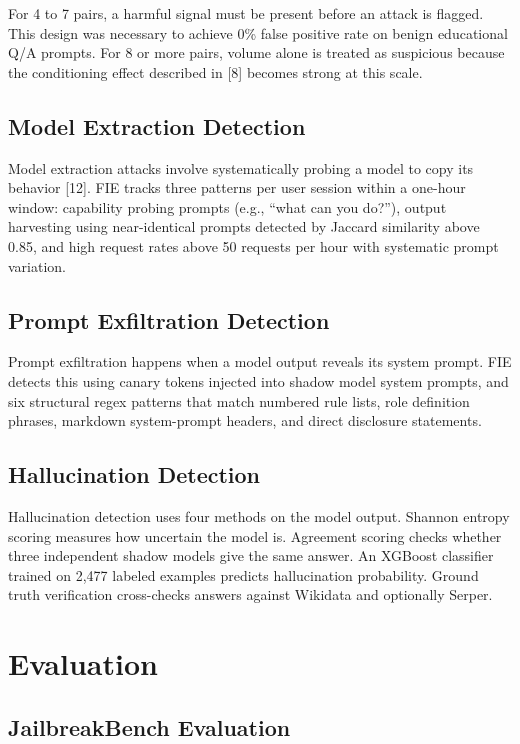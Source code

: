 \documentclass[12pt,a4paper]{article}
\begin{document}
For 4 to 7 pairs, a harmful signal must be present before an attack is flagged.
This design was necessary to achieve 0\% false positive rate on benign
educational Q/A prompts. For 8 or more pairs, volume alone is treated as
suspicious because the conditioning effect described in [8] becomes strong at
this scale.

\subsection{Model Extraction Detection}

Model extraction attacks involve systematically probing a model to copy its
behavior [12]. FIE tracks three patterns per user session within a one-hour window:
capability probing prompts (e.g., ``what can you do?''), output harvesting using
near-identical prompts detected by Jaccard similarity above 0.85, and high
request rates above 50 requests per hour with systematic prompt variation.

\subsection{Prompt Exfiltration Detection}

Prompt exfiltration happens when a model output reveals its system prompt. FIE
detects this using canary tokens injected into shadow model system prompts, and
six structural regex patterns that match numbered rule lists, role definition
phrases, markdown system-prompt headers, and direct disclosure statements.

\subsection{Hallucination Detection}

Hallucination detection uses four methods on the model output. Shannon entropy
scoring measures how uncertain the model is. Agreement scoring checks whether
three independent shadow models give the same answer. An XGBoost classifier
trained on 2,477 labeled examples predicts hallucination probability. Ground
truth verification cross-checks answers against Wikidata and optionally Serper.

\section{Evaluation}

\subsection{JailbreakBench Evaluation}
\end{document}
